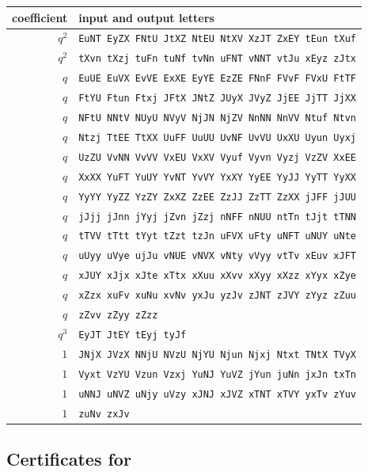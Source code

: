 \begin{center}
\small
\begin{tabular}{r@{\quad}l}
 coefficient & input and output letters \\ \hline
 $q^2$ & \texttt{EuNT EyZX FNtU JtXZ NtEU NtXV XzJT ZxEY tEun tXuf} \\
 $q^2$ & \texttt{tXvn tXzj tuFn tuNf tvNn uFNT vNNT vtJu xEyz zJtx} \\
 $q$ & \texttt{EuUE EuVX EvVE ExXE EyYE EzZE FNnF FVvF FVxU FtTF} \\
 $q$ & \texttt{FtYU Ftun Ftxj JFtX JNtZ JUyX JVyZ JjEE JjTT JjXX} \\
 $q$ & \texttt{NFtU NNtV NUyU NVyV NjJN NjZV NnNN NnVV Ntuf Ntvn} \\
 $q$ & \texttt{Ntzj TtEE TtXX UuFF UuUU UvNF UvVU UxXU Uyun Uyxj} \\
 $q$ & \texttt{UzZU VvNN VvVV VxEU VxXV Vyuf Vyvn Vyzj VzZV XxEE} \\
 $q$ & \texttt{XxXX YuFT YuUY YvNT YvVY YxXY YyEE YyJJ YyTT YyXX} \\
 $q$ & \texttt{YyYY YyZZ YzZY ZxXZ ZzEE ZzJJ ZzTT ZzXX jJFF jJUU} \\
 $q$ & \texttt{jJjj jJnn jYyj jZvn jZzj nNFF nNUU ntTn tJjt tTNN} \\
 $q$ & \texttt{tTVV tTtt tYyt tZzt tzJn uFVX uFty uNFT uNUY uNte} \\
 $q$ & \texttt{uUyy uVye ujJu vNUE vNVX vNty vVyy vtTv xEuv xJFT} \\
 $q$ & \texttt{xJUY xJjx xJte xTtx xXuu xXvv xXyy xXzz xYyx xZye} \\
 $q$ & \texttt{xZzx xuFv xuNu xvNv yxJu yzJv zJNT zJVY zYyz zZuu} \\
 $q$ & \texttt{zZvv zZyy zZzz} \\
 $q^3$ & \texttt{EyJT JtEY tEyj tyJf} \\
 $1$ & \texttt{JNjX JVzX NNjU NVzU NjYU Njun Njxj Ntxt TNtX TVyX} \\
 $1$ & \texttt{Vyxt VzYU Vzun Vzxj YuNJ YuVZ jYun juNn jxJn txTn} \\
 $1$ & \texttt{uNNJ uNVZ uNjy uVzy xJNJ xJVZ xTNT xTVY yxTv zYuv} \\
 $1$ & \texttt{zuNv zxJv} \\
\end{tabular}
\end{center}

\subsection*{Certificates for \texorpdfstring{}{Section 9}}

